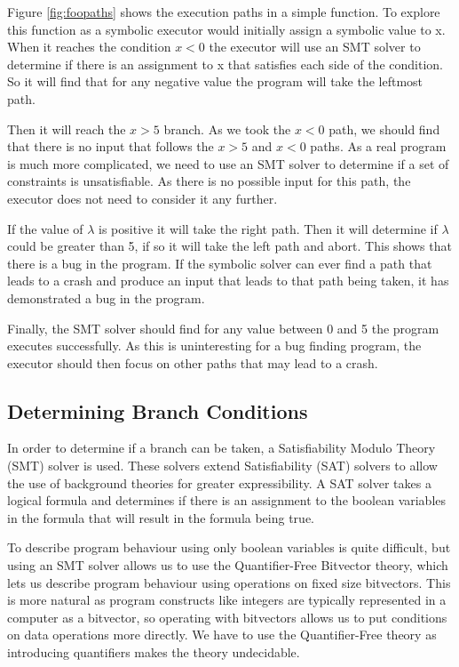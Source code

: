 \documentclass[12pt,twoside]{report}
\begin{document}
Figure \ref{fig:foopaths} shows the execution paths in a simple function. To explore this function as a symbolic executor would initially assign a symbolic value to x. When it reaches the condition $x < 0$ the executor will use an SMT solver to determine if there is an assignment to x that satisfies each side of the condition. So it will find that for any negative value the program will take the leftmost path.

Then it will reach the $x > 5$ branch. As we took the $x < 0$ path, we should find that there is no input that follows the $x > 5$ and $x < 0$ paths. As a real program is much more complicated, we need to use an SMT solver to determine if a set of constraints is unsatisfiable. As there is no possible input for this path, the executor does not need to consider it any further.

If the value of $\lambda$ is positive it will take the right path. Then it will determine if $\lambda$ could be greater than 5, if so it will take the left path and abort. This shows that there is a bug in the program. If the symbolic solver can ever find a path that leads to a crash and produce an input that leads to that path being taken, it has demonstrated a bug in the program.

Finally, the SMT solver should find for any value between 0 and 5 the program executes successfully. As this is uninteresting for a bug finding program, the executor should then focus on other paths that may lead to a crash.


\subsection{Determining Branch Conditions}
In order to determine if a branch can be taken, a Satisfiability Modulo Theory (SMT) solver \cite{Barrett2018} is used. These solvers extend Satisfiability (SAT) solvers to allow the use of background theories for greater expressibility. A SAT solver \cite{10.1007/978-3-540-24605-3_37} takes a logical formula and determines if there is an assignment to the boolean variables in the formula that will result in the formula being true. 
 

To describe program behaviour using only boolean variables is quite difficult, but using an SMT solver allows us to use the Quantifier-Free Bitvector theory, which lets us describe program behaviour using operations on fixed size bitvectors. This is more natural as program constructs like integers are typically represented in a computer as a bitvector, so operating with bitvectors allows us to put conditions on data operations more directly. We have to use the Quantifier-Free theory as introducing quantifiers makes the theory undecidable.
\end{document}
